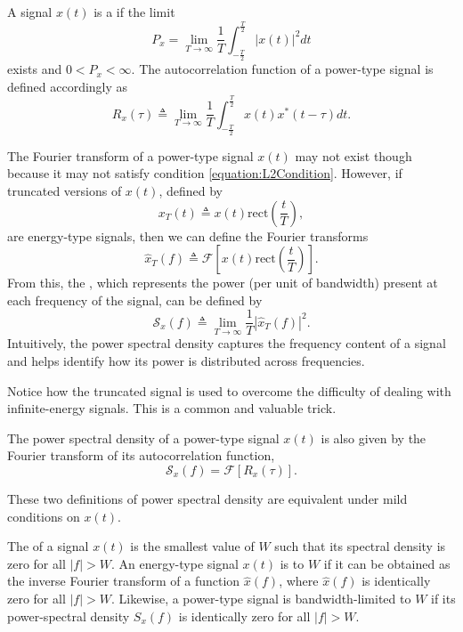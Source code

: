 A signal $x(t)$ is a  if the limit
\[ P_x = \lim_{T\rightarrow\infty} \frac{1}{T} \int_{-\frac{T}{2}}^{\frac{T}{2}} | x(t) |^2 dt \]
exists and $0 < P_x < \infty$.
The autocorrelation function of a power-type signal is defined accordingly as
\begin{equation*}
R_x(\tau) \triangleq  \lim_{T\rightarrow\infty} \frac{1}{T} \int_{-\frac{T}{2}}^{\frac{T}{2}} x(t)x^*(t - \tau) dt .
\end{equation*}

The Fourier transform of a power-type signal $x(t)$ may not exist though because it may not satisfy condition \eqref{equation:L2Condition}.
However, if truncated versions of $x(t)$, defined by
\begin{equation*}
x_T(t) \triangleq x(t) \mathrm{rect} \left( \frac{t}{T} \right) ,
\end{equation*}
are energy-type signals, then we can define the Fourier transforms
\begin{equation*}
\hat{x}_T(f) \triangleq \mathcal{F} \left[ x(t) \mathrm{rect} \left( \frac{t}{T} \right) \right] .
\end{equation*}
From this, the , which represents the power (per unit of bandwidth) present at each frequency of the signal, can be defined by
\begin{equation*}
\mathcal{S}_x(f) \triangleq \lim_{T \rightarrow \infty} \frac{1}{T} |\hat{x}_T(f)|^2 .
\end{equation*}
Intuitively, the power spectral density captures the frequency content of a signal and helps identify how its power is distributed across frequencies.

Notice how the truncated signal is used to overcome the difficulty of dealing with infinite-energy signals.
This is a common and valuable trick.

\begin{definition}
The power spectral density of a power-type signal $x(t)$ is also given by the Fourier transform of its autocorrelation function,
\begin{equation*}
\mathcal{S}_x (f) = \mathcal{F} [ R_x (\tau) ].
\end{equation*}
\end{definition}
These two definitions of power spectral density are equivalent under mild conditions on $x(t)$.

The  of a signal $x(t)$ is the smallest value of $W$ such that its spectral density is zero for all $|f| > W$.
An energy-type signal $x(t)$ is  to $W$ if it can be obtained as the inverse Fourier transform of a function $\hat{x}(f)$, where $\hat{x}(f)$ is identically zero for all $|f| > W$.
Likewise, a power-type signal is bandwidth-limited to $W$ if its power-spectral density $S_x (f)$ is identically zero for all $|f| > W$.

